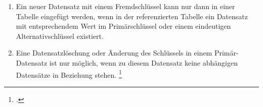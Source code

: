 \documentclass{bschlangaul-aufgabe}
\begin{document}
\begin{enumerate}
\begin{bAntwort}
\begin{enumerate}
\item Ein neuer Datensatz mit einem Fremdschlüssel kann nur dann in
einer Tabelle eingefügt werden, wenn in der referenzierten Tabelle ein
Datensatz mit entsprechendem Wert im Primärschlüssel oder einem
eindeutigen Alternativschlüssel existiert.

\item Eine Datensatzlöschung oder Änderung des Schlüssels in einem
Primär-Datensatz ist nur möglich, wenn zu diesem Datensatz keine
abhängigen Datensätze in Beziehung stehen.
\footcite{wiki:referentielle-Integritaet}
\end{enumerate}
\end{bAntwort}
\end{enumerate}
\end{document}

